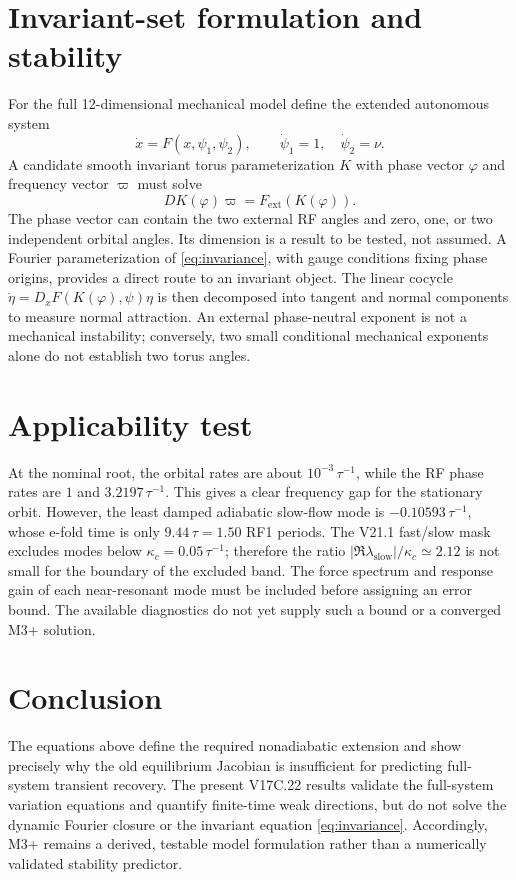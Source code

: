 \documentclass[11pt]{article}
\begin{document}
\section{Invariant-set formulation and stability}
For the full 12-dimensional mechanical model define the extended autonomous
system
\begin{equation}
 \dot x=F(x,\psi_1,\psi_2),\qquad \dot\psi_1=1,\quad\dot\psi_2=\nu.
\end{equation}
A candidate smooth invariant torus parameterization $K$ with phase vector
$\varphi$ and frequency vector $\varpi$ must solve
\begin{equation}
 DK(\varphi)\varpi=F_{\mathrm{ext}}(K(\varphi)).
 \label{eq:invariance}
\end{equation}
The phase vector can contain the two external RF angles and zero, one, or two
independent orbital angles.  Its dimension is a result to be tested, not
assumed.  A Fourier parameterization of \eqref{eq:invariance}, with gauge
conditions fixing phase origins, provides a direct route to an invariant
object.  The linear cocycle $\dot\eta=D_xF(K(\varphi),\psi)\eta$ is then
decomposed into tangent and normal components to measure normal attraction.
An external phase-neutral exponent is not a mechanical instability; conversely,
two small conditional mechanical exponents alone do not establish two torus
angles.

\section{Applicability test}
At the nominal root, the orbital rates are about $10^{-3}\,\tau^{-1}$,
while the RF phase rates are $1$ and $3.2197\,\tau^{-1}$.  This gives a
clear frequency gap for the stationary orbit.  However, the least damped
adiabatic slow-flow mode is $-0.10593\,\tau^{-1}$, whose e-fold time is only
$9.44\,\tau=1.50$ RF1 periods.  The V21.1 fast/slow mask excludes modes below
$\kappa_c=0.05\,\tau^{-1}$; therefore the ratio
$|\Re\lambda_{\mathrm{slow}}|/\kappa_c\simeq2.12$ is not small for the
boundary of the excluded band.  The force spectrum and response gain of each
near-resonant mode must be included before assigning an error bound.  The
available diagnostics do not yet supply such a bound or a converged M3+
solution.

\section{Conclusion}
The equations above define the required nonadiabatic extension and show
precisely why the old equilibrium Jacobian is insufficient for predicting
full-system transient recovery.  The present V17C.22 results validate the
full-system variation equations and quantify finite-time weak directions, but
do not solve the dynamic Fourier closure or the invariant equation
\eqref{eq:invariance}.  Accordingly, M3+ remains a derived, testable model
formulation rather than a numerically validated stability predictor.
\end{document}
